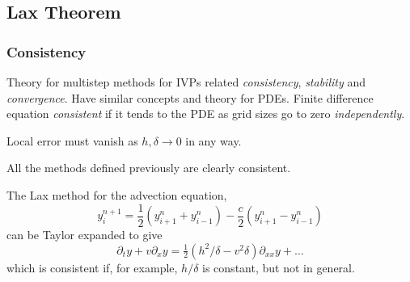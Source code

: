 \documentclass{beamer}
\begin{document}
\subsection{Lax Theorem}

\begin{frame}
  \frametitle{Consistency}

  \begin{overlayarea}{\textwidth}{0.8\textheight}
    {
      Theory for multistep methods for IVPs related
      \emph{consistency}, \emph{stability} and \emph{convergence}.
      Have similar concepts and theory for PDEs.
    }
    {
      Finite difference equation \emph{consistent} if it tends to the
      PDE as grid sizes go to zero \emph{independently}.
    }
    {

      \vspace{1ex}
      Local error must vanish as $h, \delta \rightarrow 0$ in any way.
    }
    {

      \vspace{1ex}
      All the methods defined previously are clearly consistent.
    }
    {

      \vspace{1ex}
      The Lax method for the advection equation,
      \begin{equation*}
        y_i^{n+1} = \frac{1}{2} \left( y_{i+1}^n + y_{i-1}^n \right) -
        \frac{c}{2} \left( y_{i+1}^n - y_{i-1}^n \right)
      \end{equation*}
      can be Taylor expanded to give
      \begin{equation*}
        \partial_t y + v \partial_x y = \tfrac{1}{2} \left(
          h^2 / \delta - v^2 \delta \right) \partial_{x x} y + \dots
      \end{equation*}
      which is consistent if, for example, $h / \delta$ is constant, but
      not in general.
    }
  \end{overlayarea}

\end{frame}
\end{document}
